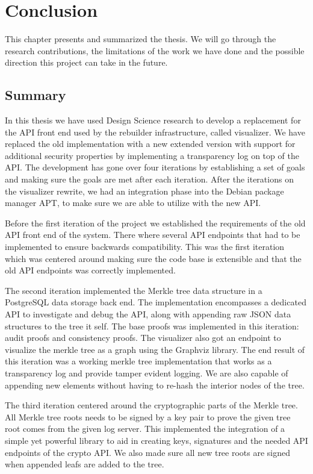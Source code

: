 \documentclass[../Main/thesis.tex]{subfiles}
\begin{document}
\chapter{Conclusion}%
\label{ch:conclusion}
This chapter presents and summarized the thesis. We will go through the research
contributions, the limitations of the work we have done and the possible
direction this project can take in the future.

\section{Summary}%
\label{sec:summary}
In this thesis we have used Design Science research to develop a replacement for
the API front end used by the rebuilder infrastructure, called visualizer. We
have replaced the old implementation with a new extended version with support
for additional security properties by implementing a transparency log on top of
the API. The development has gone over four iterations by establishing a set of
goals and making sure the goals are met after each iteration. After the
iterations on the visualizer rewrite, we had an integration phase into the
Debian package manager APT, to make sure we are able to utilize with the new
API.

Before the first iteration of the project we established the requirements of the
old API front end of the system. There where several API endpoints that had to be
implemented to ensure backwards compatibility. This was the first iteration
which was centered around making sure the code base is extensible and that the
old API endpoints was correctly implemented.

The second iteration implemented the Merkle tree data structure in a PostgreSQL
data storage back end. The implementation encompasses a dedicated API to
investigate and debug the API, along with appending raw JSON data structures to
the tree it self. The base proofs was implemented in this iteration: audit
proofs and consistency proofs. The visualizer also got an endpoint to visualize
the merkle tree as a graph using the Graphviz library. The end result of this
iteration was a working merkle tree implementation that works as a transparency
log and provide tamper evident logging. We are also capable of appending new
elements without having to re-hash the interior nodes of the tree.

The third iteration centered around the cryptographic parts of the Merkle tree.
All Merkle tree roots needs to be signed by a key pair to prove the given tree
root comes from the given log server. This implemented the integration of a
simple yet powerful library to aid in creating keys, signatures and the needed
API endpoints of the crypto API. We also made sure all new tree roots are signed
when appended leafs are added to the tree.
\end{document}
